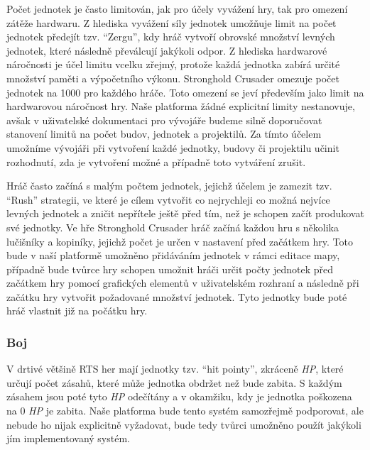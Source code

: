 Počet jednotek je často limitován, jak pro účely vyvážení hry, tak pro omezení zátěže hardwaru. Z hlediska vyvážení síly jednotek umožňuje limit na počet jednotek předejít tzv. ``Zergu'', kdy hráč vytvoří obrovské množství levných jednotek, které následně převálcují jakýkoli odpor. Z hlediska hardwarové náročnosti je účel limitu vcelku zřejmý, protože každá jednotka zabírá určité množství paměti a výpočetního výkonu. Stronghold Crusader omezuje počet jednotek na 1000 pro každého hráče. Toto omezení se jeví především jako limit na hardwarovou náročnost hry. Naše platforma žádné explicitní limity nestanovuje, avšak v uživatelské dokumentaci pro vývojáře budeme silně doporučovat stanovení limitů na počet budov, jednotek a projektilů. Za tímto účelem umožníme vývojáři při vytvoření každé jednotky, budovy či projektilu učinit rozhodnutí, zda je vytvoření možné a případně toto vytváření zrušit. 

Hráč často začíná s malým počtem jednotek, jejichž účelem je zamezit tzv. ``Rush'' strategii, ve které je cílem vytvořit co nejrychleji co možná nejvíce levných jednotek a zničit nepřítele ještě před tím, než je schopen začít produkovat své jednotky. Ve hře Stronghold Crusader hráč začíná každou hru s několika lučišníky a kopiníky, jejichž počet je určen v nastavení před začátkem hry. Toto bude v naší platformě umožněno přidáváním jednotek v rámci editace mapy, případně bude tvůrce hry schopen umožnit hráči určit počty jednotek před začátkem hry pomocí grafických elementů v uživatelském rozhraní a následně při začátku hry vytvořit požadované množství jednotek. Tyto jednotky bude poté hráč vlastnit již na počátku hry.

\subsubsection{Boj}

V drtivé většině RTS her mají jednotky tzv. ``hit pointy'', zkráceně \textit{HP}, které určují počet zásahů, které může jednotka obdržet než bude zabita. S každým zásahem jsou poté tyto \textit{HP} odečítány a v okamžiku, kdy je jednotka poškozena na 0 \textit{HP} je zabita. Naše platforma bude tento systém samozřejmě podporovat, ale nebude ho nijak explicitně vyžadovat, bude tedy tvůrci umožněno použít jakýkoli jím implementovaný systém. 

